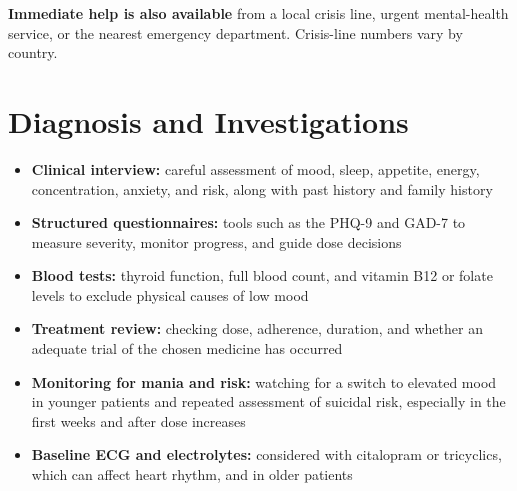 \textbf{Immediate help is also available} from a local crisis line, urgent mental-health service, or the nearest emergency department. Crisis-line numbers vary by country.

\section*{Diagnosis and Investigations}
\begin{itemize}
    \item \textbf{Clinical interview:} careful assessment of mood, sleep, appetite, energy, concentration, anxiety, and risk, along with past history and family history
    \item \textbf{Structured questionnaires:} tools such as the PHQ-9 and GAD-7 to measure severity, monitor progress, and guide dose decisions
    \item \textbf{Blood tests:} thyroid function, full blood count, and vitamin B12 or folate levels to exclude physical causes of low mood
    \item \textbf{Treatment review:} checking dose, adherence, duration, and whether an adequate trial of the chosen medicine has occurred
    \item \textbf{Monitoring for mania and risk:} watching for a switch to elevated mood in younger patients and repeated assessment of suicidal risk, especially in the first weeks and after dose increases
    \item \textbf{Baseline ECG and electrolytes:} considered with citalopram or tricyclics, which can affect heart rhythm, and in older patients
\end{itemize}


